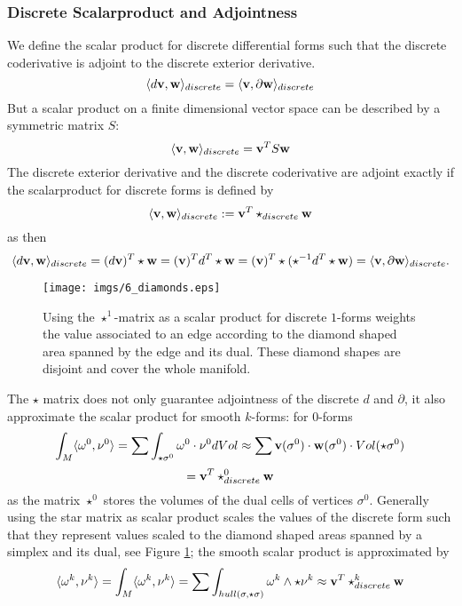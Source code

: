 \subsubsection{Discrete Scalarproduct and Adjointness}
\label{subsec:5_discreteScalarprod}
We define the scalar product for discrete differential forms such that the discrete coderivative is adjoint to the discrete exterior derivative.
\[\langle d\textbf{v}, \textbf{w} \rangle_{discrete} = \langle \textbf{v}, \partial \textbf{w}\rangle_{discrete}\]
But a scalar product on a finite dimensional vector space can be  described by a symmetric matrix $S$:
\[\langle \textbf{v}, \textbf{w} \rangle_{discrete} = \textbf{v}^TS\textbf{w}\]
The discrete exterior derivative and the discrete coderivative are adjoint exactly if the scalarproduct for discrete forms is defined by
\begin{equation}
\langle \textbf{v}, \textbf{w} \rangle_{discrete} := \textbf{v}^T\star_{discrete}\textbf{w}
\label{eq:discreteScalarprod}
\end{equation}
as then
\[\langle d\textbf{v}, \textbf{w} \rangle_{discrete} = (d\textbf{v})^T\star \textbf{w} =  
(\textbf{v})^T d^T\star \textbf{w} =  (\textbf{v})^T \star (\star^{-1}d^T\star \textbf{w}) =  \langle \textbf{v}, \partial \textbf{w}\rangle_{discrete}.\]

\begin{figure}%
\begin{center}
\texttt{[image: imgs/6\_diamonds.eps]}%
\end{center}
\caption{Using the $\star^1$-matrix as a scalar product for discrete $1$-forms weights the value associated to an edge according to the diamond shaped area spanned by the edge and its dual. These diamond shapes are disjoint and cover the whole manifold.}%
\label{fig:6_diamonds}%
\end{figure}

The $\star$ matrix does not only guarantee adjointness of the discrete $d$ and $\partial$, it also approximate the scalar product for smooth $k$-forms: for 0-forms
\[\int_{M}\langle \omega^0, \nu^0 \rangle = \sum \int_{\star \sigma^0} \omega^0 \cdot \nu^0 dVol \approx \sum \textbf{v}(\sigma^0) \cdot \textbf{w}(\sigma^0) \cdot Vol(\star\sigma^0) \]
\[= \textbf{v}^T \star^0_{discrete} \textbf{w}\]
as the matrix $\star^0$ stores the volumes of the dual cells of vertices $\sigma^0$. Generally using the star matrix as scalar product scales the values of the discrete form such that they represent values scaled to the diamond shaped areas spanned by a simplex and its dual, see Figure \ref{fig:6_diamonds}; the smooth scalar product is approximated by
\[\langle \omega^k, \nu^k\rangle = \int_{M}\langle \omega^k, \nu^k \rangle = \sum \int_{hull(\sigma ,\star \sigma)} \omega^k \wedge \star \nu^k \approx \textbf{v}^T \star^k_{discrete} \textbf{w}\]
 
